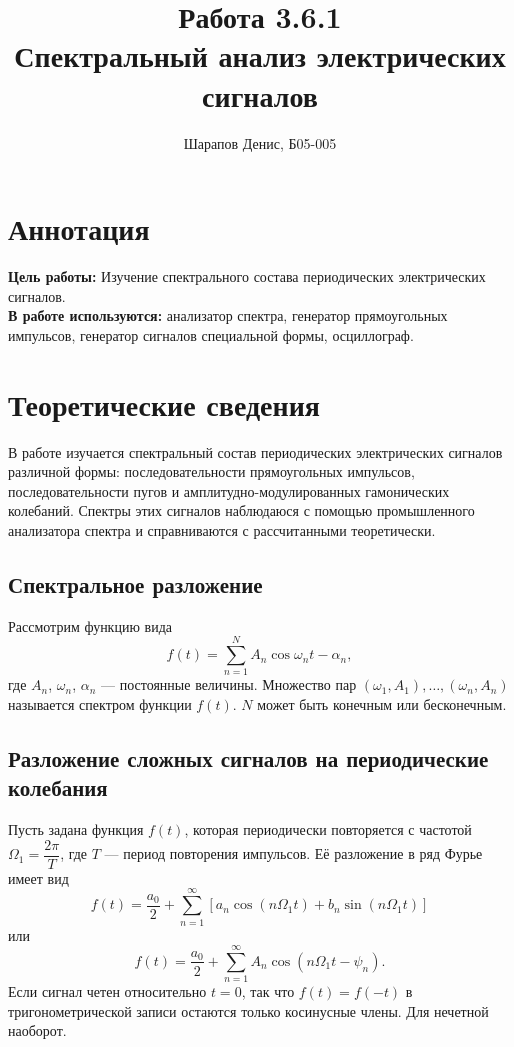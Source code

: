 \documentclass[a4paper]{article}
\title{Работа 3.6.1 \\ Спектральный анализ электрических сигналов}
\author{Шарапов Денис, Б05-005}
\date{}
\theoremstyle{definition}
\theoremstyle{remark}
\begin{document}
    \maketitle
    \tableofcontents
    \newpage
    
\section{Аннотация}

 \textbf{Цель работы:} Изучение спектрального состава периодических электрических сигналов. \\
 
 \noindent \textbf{В работе используются:} анализатор спектра, генератор прямоугольных импульсов, генератор сигналов специальной формы, осциллограф.
 
 \section{Теоретические сведения}
 
В работе изучается спектральный состав периодических электрических сигналов различной формы: последовательности прямоугольных импульсов, последовательности пугов и амплитудно-модулированных гамонических колебаний. Спектры этих сигналов наблюдаюся с помощью промышленного анализатора спектра и справниваются с рассчитанными теоретически.

 \subsection{Спектральное разложение}

 Рассмотрим функцию вида $$f(t) = \sum\limits^{N}_{n=1}A_n\cos{\omega_n t - \alpha_n},$$ где $A_n$, $\omega_n$, $\alpha_n$ --- постоянные величины. Множество пар $(\omega_1, A_1), \ldots, (\omega_n, A_n)$ называется спектром функции $f(t)$. $N$ может быть конечным или бесконечным.

\subsection{Разложение сложных сигналов на периодические колебания}

Пусть задана функция $f(t)$, которая периодически повторяется с частотой $\Omega_1 = \dfrac{2\pi}{T}$, где $T$ --- период повторения импульсов. Её разложение в ряд Фурье имеет вид 
\begin{equation}
f(t) = \dfrac{a_0}{2} + \sum\limits_{n = 1}^{\infty}\left[a_n \cos \left(n \Omega_1t\right) + b_n \sin \left(n \Omega_1t\right)\right]
\end{equation}
или
\begin{equation}
f(t) = \dfrac{a_0}{2} + \sum\limits_{n = 1}^{\infty}A_n \cos \left(n\Omega_1t-\psi_n\right).
\end{equation}
Если сигнал четен относительно $t=0$, так что $f(t) = f(-t)$ в тригонометрической записи остаются только косинусные члены. Для нечетной наоборот.
\end{document}
